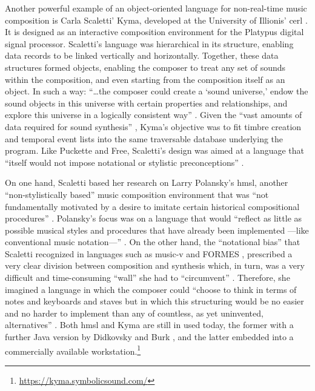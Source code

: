 Another powerful example of an object-oriented language for non-real-time music composition is Carla Scaletti' Kyma, developed at the University of Illionis' \gls{cerl} \parencite{DBLP:conf/icmc/Scaletti87}. It is designed as an interactive composition environment for the Platypus digital signal processor. Scaletti's language was hierarchical in its structure, enabling data records to be linked vertically and horizontally. Together, these data structures formed objects, enabling the composer to treat any set of sounds within the composition, and even starting from the composition itself as an object. In such a way: ``\dots the composer could create a `sound universe,' endow the sound objects in this universe with certain properties and relationships, and explore this universe in a logically consistent way'' \parencite[50]{DBLP:conf/icmc/Scaletti87}. Given the ``vast amounts of data required for sound synthesis'' \parencite[50]{DBLP:conf/icmc/Scaletti87}, Kyma's objective was to fit timbre creation and temporal event lists into the same traversable database underlying the program. Like Puckette and Free, Scaletti's design was aimed at a language that ``itself would not impose notational or stylistic preconceptions'' \parencite[50]{DBLP:conf/icmc/Scaletti87}.

On one hand, Scaletti based her research on Larry Polansky's \gls{hmsl}, another ``non-stylistically based'' music composition environment that was ``not fundamentally motivated by a desire to imitate certain historical compositional procedures'' \parencite[224]{DBLP:conf/icmc/RosenboomP85}. Polansky's focus was on a language that would ``reflect as little as possible musical styles and procedures that have already been implemented ---like conventional music notation---'' \parencite[224]{DBLP:conf/icmc/RosenboomP85}. On the other hand, the ``notational bias'' \parencite[49]{DBLP:conf/icmc/Scaletti87} that Scaletti recognized in languages such as \gls{music-v} and FORMES \parencites{DBLP:conf/icmc/RodetBCP82}{DBLP:conf/icmc/BoyntonDPR86}, prescribed a very clear division between composition and synthesis which, in turn, was a very difficult and time-consuming ``wall'' she had to ``circumvent'' \parencite[49]{DBLP:conf/icmc/Scaletti87}. Therefore, she imagined a language in which the composer could ``choose to think in terms of notes and keyboards and staves but in which this structuring would be no easier and no harder to implement than any of countless, as yet uninvented, alternatives'' \parencite[49]{DBLP:conf/icmc/Scaletti87}. Both \gls{hmsl} and Kyma are still in used today, the former with a further Java version by Didkovsky and Burk \parencite{DBLP:conf/icmc/DidkovskyB01}, and the latter embedded into a commercially available workstation.\footnote{\url{https://kyma.symbolicsound.com/}}

